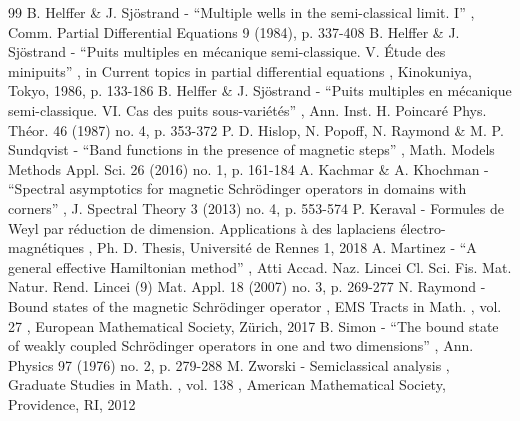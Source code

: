 \documentclass[10pt]{amsart}
\theoremstyle{plain}
\theoremstyle{definition}
\begin{document}
\begin{thebibliography}{99}
 B. Helffer \& J. Sjöstrand - “Multiple wells in the semi-classical limit. I” , Comm. Partial Differential Equations 9 (1984), p. 337-408
 B. Helffer \& J. Sjöstrand - “Puits multiples en mécanique semi-classique. V. Étude des minipuits” , in Current topics in partial differential equations , Kinokuniya, Tokyo, 1986, p. 133-186
 B. Helffer \& J. Sjöstrand - “Puits multiples en mécanique semi-classique. VI. Cas des puits sous-variétés” , Ann. Inst. H. Poincaré Phys. Théor. 46 (1987) no. 4, p. 353-372
 P. D. Hislop, N. Popoff, N. Raymond \& M. P. Sundqvist - “Band functions in the presence of magnetic steps” , Math. Models Methods Appl. Sci. 26 (2016) no. 1, p. 161-184
 A. Kachmar \& A. Khochman - “Spectral asymptotics for magnetic Schrödinger operators in domains with corners” , J. Spectral Theory 3 (2013) no. 4, p. 553-574
 P. Keraval - Formules de Weyl par réduction de dimension. Applications à des laplaciens électro-magnétiques , Ph. D. Thesis, Université de Rennes 1, 2018
 A. Martinez - “A general effective Hamiltonian method” , Atti Accad. Naz. Lincei Cl. Sci. Fis. Mat. Natur. Rend. Lincei (9) Mat. Appl. 18 (2007) no. 3, p. 269-277
 N. Raymond - Bound states of the magnetic Schrödinger operator , EMS Tracts in Math. , vol. 27 , European Mathematical Society, Zürich, 2017
 B. Simon - “The bound state of weakly coupled Schrödinger operators in one and two dimensions” , Ann. Physics 97 (1976) no. 2, p. 279-288
 M. Zworski - Semiclassical analysis , Graduate Studies in Math. , vol. 138 , American Mathematical Society, Providence, RI, 2012
\end{thebibliography}
\end{document}
